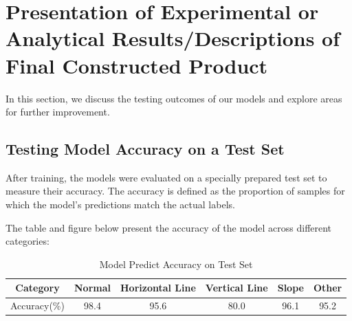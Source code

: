 \section{Presentation of Experimental or Analytical Results/Descriptions of Final Constructed Product}

In this section, we discuss the testing outcomes of our models and explore areas for further improvement.

\subsection{Testing Model Accuracy on a Test Set}

After training, the models were evaluated on a specially prepared test set to measure their accuracy. The accuracy is defined as the proportion of samples for which the model's predictions match the actual labels.

The table and figure below present the accuracy of the model across different categories:


\begin{table}[H]
    \centering
    \caption{Model Predict Accuracy on Test Set}
    \begin{tabular}{c*{5}{c}}
        \toprule
        Category & Normal & Horizontal Line & Vertical Line & Slope & Other \\
        \midrule
        Accuracy(\%) & 98.4 & 95.6 & 80.0 & 96.1 & 95.2 \\
        \bottomrule
    \end{tabular}
    \label{tab:model_accuracy}
\end{table}

